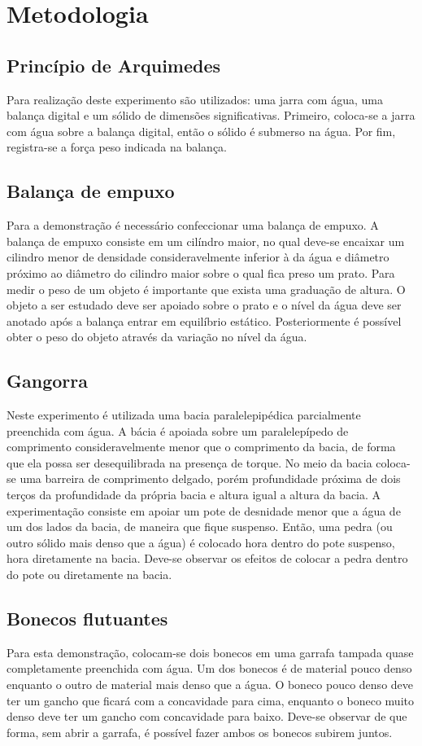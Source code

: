 \section{Metodologia}

\subsection{Princípio de Arquimedes}
Para realização deste experimento são utilizados: uma jarra com água, uma balança digital e um sólido de dimensões significativas. Primeiro, coloca-se a jarra com água sobre a balança digital, então o sólido é submerso na água. Por fim, registra-se a força peso indicada na balança.

\subsection{Balança de empuxo}
Para a demonstração é necessário confeccionar uma balança de empuxo. A balança de empuxo consiste em um cilíndro maior, no qual deve-se encaixar um cilindro menor de densidade consideravelmente inferior à da água e diâmetro próximo ao diâmetro do cilindro maior sobre o qual fica preso um prato. Para medir o peso de um objeto é importante que exista uma graduação de altura. O objeto a ser estudado deve ser apoiado sobre o prato e o nível da água deve ser anotado após a balança entrar em equilíbrio estático. Posteriormente é possível obter o peso do objeto através da variação no nível da água.

\subsection{Gangorra}
Neste experimento é utilizada uma bacia paralelepipédica parcialmente preenchida com água. A bácia é apoiada sobre um paralelepípedo de comprimento consideravelmente menor que o comprimento da bacia, de forma que ela possa ser desequilibrada na presença de torque. No meio da bacia coloca-se uma barreira de comprimento delgado, porém profundidade próxima de dois terços da profundidade da própria bacia e altura igual a altura da bacia. A experimentação consiste em apoiar um pote de desnidade menor que a água de um dos lados da bacia, de maneira que fique suspenso. Então, uma pedra (ou outro sólido mais denso que a água) é colocado hora dentro do pote suspenso, hora diretamente na bacia. Deve-se observar os efeitos de colocar a pedra dentro do pote ou diretamente na bacia. 

\subsection{Bonecos flutuantes}
Para esta demonstração, colocam-se dois bonecos em uma garrafa tampada quase completamente preenchida com água. Um dos bonecos é de material pouco denso enquanto o outro de material mais denso que a água. O boneco pouco denso deve ter um gancho que ficará com a concavidade para cima, enquanto o boneco muito denso deve ter um gancho com concavidade para baixo. Deve-se observar de que forma, sem abrir a garrafa, é possível fazer ambos os bonecos subirem juntos. 


